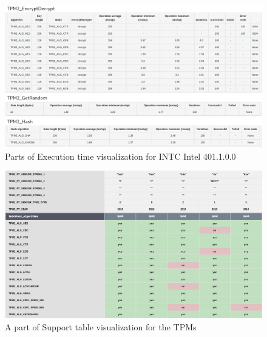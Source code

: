 \begin{landscape}
    \begin{figure}[!t]
        \includegraphics[width=\linewidth, height=\textwidth]{img/visualizations/tpm-execution-time.png}
        \caption{Parts of Execution time visualization for INTC Intel 401.1.0.0}
    \end{figure}
\end{landscape}

\begin{landscape}
    \begin{figure}[!t]
        \includegraphics[width=\linewidth, height=\textwidth]{img/visualizations/tpm-support-data.png}
        \caption{A part of Support table visualization for the TPMs}
    \end{figure}
\end{landscape}

